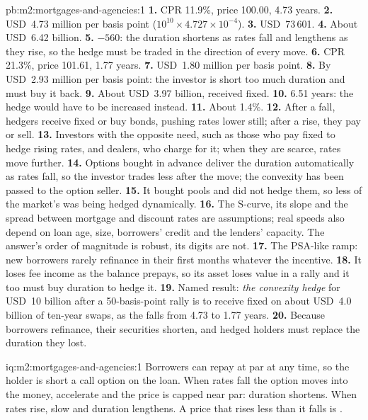 \begin{solution}{pb:m2:mortgages-and-agencies:1}
\textbf{1.} CPR 11.9\%, price 100.00,  4.73 years.
\textbf{2.} USD~4.73 million per basis point ($10^{10} \times 4.727 \times 10^{-4}$).
\textbf{3.} USD~73\,601.
\textbf{4.} About USD~6.42 billion.
\textbf{5.} $-560$: the duration shortens as rates fall and lengthens as they
rise, so the hedge must be traded in the direction of every move.
\textbf{6.} CPR 21.3\%, price 101.61,  1.77 years.
\textbf{7.} USD~1.80 million per basis point.
\textbf{8.} By USD~2.93 million per basis point: the investor is short too much
duration and must buy it back.
\textbf{9.} About USD~3.97 billion, received fixed.
\textbf{10.} 6.51 years: the hedge would have to be increased instead.
\textbf{11.} About 1.4\%.
\textbf{12.} After a fall, hedgers receive fixed or buy bonds, pushing rates
lower still; after a rise, they pay or sell.
\textbf{13.} Investors with the opposite need, such as those who pay fixed
to hedge rising rates, and dealers, who charge for it; when they are scarce,
rates move further.
\textbf{14.} Options bought in advance deliver the duration automatically as
rates fall, so the investor trades less after the move; the convexity has been
passed to the option seller.
\textbf{15.} It bought pools and did not hedge them, so less of the market's
 was being hedged dynamically.
\textbf{16.} The S-curve, its slope and the spread between mortgage and discount
rates are assumptions; real speeds also depend on loan age, size, borrowers'
credit and the lenders' capacity. The answer's order of magnitude is robust,
its digits are not.
\textbf{17.} The PSA-like ramp: new borrowers rarely refinance in their first
months whatever the incentive.
\textbf{18.} It loses fee income as the balance prepays, so its asset loses value
in a rally and it too must buy duration to hedge it.
\textbf{19.} Named result: \emph{the convexity hedge} for USD~10 billion after
a 50-basis-point rally is to receive fixed on about USD~4.0 billion of
ten-year swaps, as the  falls from 4.73 to 1.77 years.
\textbf{20.} Because borrowers refinance, their securities shorten, and hedged
holders must replace the duration they lost.
\end{solution}

\begin{solution}{iq:m2:mortgages-and-agencies:1}
Borrowers can repay at par at any time, so the holder is short a call option
on the loan. When rates fall the option moves into the money, 
accelerate and the price is capped near par: duration shortens. When rates
rise,  slow and duration lengthens. A price that rises less than it
falls is .
\end{solution}

